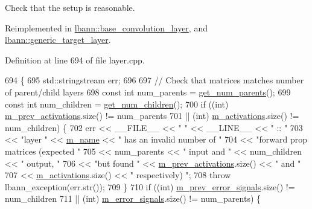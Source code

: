Check that the setup is reasonable. 

Reimplemented in \hyperlink{classlbann_1_1base__convolution__layer_afa07aaa293d12cc7d28fbc8a96025900}{lbann\+::base\+\_\+convolution\+\_\+layer}, and \hyperlink{classlbann_1_1generic__target__layer_a35375f4cf914ba5a308fdbd98c589408}{lbann\+::generic\+\_\+target\+\_\+layer}.



Definition at line 694 of file layer.\+cpp.


\begin{DoxyCode}
694                         \{
695   std::stringstream err;
696 
697   \textcolor{comment}{// Check that matrices matches number of parent/child layers}
698   \textcolor{keyword}{const} \textcolor{keywordtype}{int} num\_parents = \hyperlink{classlbann_1_1Layer_ac9290d4a6453ccda5f6b4d8b57b49ba3}{get\_num\_parents}();
699   \textcolor{keyword}{const} \textcolor{keywordtype}{int} num\_children = \hyperlink{classlbann_1_1Layer_a1409a117c31a7ea4f2c7a4d22a3e86c3}{get\_num\_children}();
700   \textcolor{keywordflow}{if} ((\textcolor{keywordtype}{int}) \hyperlink{classlbann_1_1Layer_a52314601c3458268f56e017dc2ade357}{m\_prev\_activations}.size() != num\_parents
701       || (int) \hyperlink{classlbann_1_1Layer_a7caf08e938141d1584e6939cefa4baed}{m\_activations}.size() != num\_children) \{
702     err << \_\_FILE\_\_ << \textcolor{stringliteral}{" "} << \_\_LINE\_\_ << \textcolor{stringliteral}{" :: "}
703         << \textcolor{stringliteral}{"layer "} << \hyperlink{classlbann_1_1Layer_aa47109ad09b399142fa92f9d3702189f}{m\_name} << \textcolor{stringliteral}{" has an invalid number of "}
704         << \textcolor{stringliteral}{"forward prop matrices (expected "}
705         << num\_parents << \textcolor{stringliteral}{" input and "} << num\_children << \textcolor{stringliteral}{" output, "}
706         << \textcolor{stringliteral}{"but found "} << \hyperlink{classlbann_1_1Layer_a52314601c3458268f56e017dc2ade357}{m\_prev\_activations}.size() << \textcolor{stringliteral}{" and "}
707         << \hyperlink{classlbann_1_1Layer_a7caf08e938141d1584e6939cefa4baed}{m\_activations}.size() << \textcolor{stringliteral}{" respectively) "};
708     \textcolor{keywordflow}{throw} lbann\_exception(err.str());
709   \}
710   \textcolor{keywordflow}{if} ((\textcolor{keywordtype}{int}) \hyperlink{classlbann_1_1Layer_a6fdcbf884150d0b20cffe678fefd7caa}{m\_prev\_error\_signals}.size() != num\_children
711       || (int) \hyperlink{classlbann_1_1Layer_a452e22ac81c1a799f0614b3e942ea726}{m\_error\_signals}.size() != num\_parents) \{

\end{DoxyCode}
